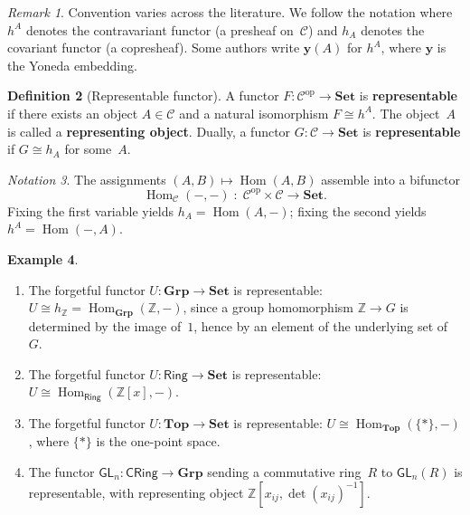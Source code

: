\documentclass[a4paper,12pt]{book}
\DeclareMathOperator{\Hom}{Hom}
\newcommand{\Set}{\mathbf{Set}}
\newcommand{\Grp}{\mathbf{Grp}}
\newcommand{\Top}{\mathbf{Top}}
\newcommand{\op}{\mathrm{op}}
\theoremstyle{definition}
\newtheorem{definition}{Definition}[section]
\newtheorem{example}[definition]{Example}
\theoremstyle{plain}
\theoremstyle{remark}
\newtheorem{remark}[definition]{Remark}
\newtheorem{notation}[definition]{Notation}
\begin{document}
\begin{remark}\label{rem:representable-conventions}
Convention varies across the literature.  We follow the notation where
$h^A$ denotes the contravariant functor (a presheaf on~$\mathcal{C}$)
and $h_A$ denotes the covariant functor (a copresheaf).
Some authors write $\mathbf{y}(A)$ for $h^A$, where $\mathbf{y}$ is the
Yoneda embedding.
\end{remark}

\begin{definition}[Representable functor]\label{def:representable}
A functor $F\colon\mathcal{C}^{\op}\to\Set$ is \textbf{representable}
if there exists an object $A\in\mathcal{C}$ and a natural isomorphism
$F\cong h^A$.  The object~$A$ is called a \textbf{representing object}.
Dually, a functor $G\colon\mathcal{C}\to\Set$ is \textbf{representable}
if $G\cong h_A$ for some~$A$.
\end{definition}

\begin{notation}\label{not:hom-bifunctor}
The assignments $(A,B)\mapsto\Hom(A,B)$ assemble into a bifunctor
\[
    \Hom_{\mathcal{C}}(-,-) \;\colon\;
    \mathcal{C}^{\op}\times\mathcal{C} \longrightarrow \Set.
\]
Fixing the first variable yields $h_A = \Hom(A,-)$; fixing the second
yields $h^A = \Hom(-,A)$.
\end{notation}

\begin{example}\label{ex:representable-forgetful}
\begin{enumerate}[label=(\roman*)]
\item The forgetful functor $U\colon\Grp\to\Set$ is representable:
    $U\cong h_{\mathbb{Z}} = \Hom_{\Grp}(\mathbb{Z},-)$, since a
    group homomorphism $\mathbb{Z}\to G$ is determined by the image
    of~$1$, hence by an element of the underlying set of~$G$.

\item The forgetful functor $U\colon\mathsf{Ring}\to\Set$ is
    representable: $U\cong\Hom_{\mathsf{Ring}}(\mathbb{Z}[x],-)$.

\item The forgetful functor $U\colon\Top\to\Set$ is representable:
    $U\cong\Hom_{\Top}(\{*\},-)$, where $\{*\}$ is the one-point space.

\item The functor $\mathsf{GL}_n\colon\mathsf{CRing}\to\Grp$ sending
    a commutative ring~$R$ to $\mathsf{GL}_n(R)$ is representable, with
    representing object $\mathbb{Z}[x_{ij},\det(x_{ij})^{-1}]$.
\end{enumerate}
\end{example}
\end{document}
